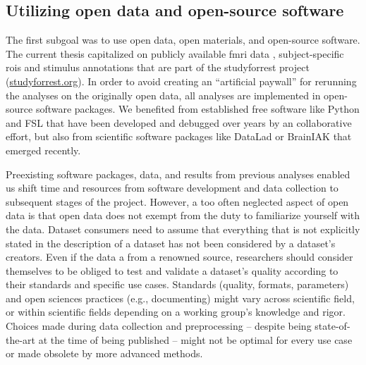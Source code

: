 \subsection{Utilizing open data and open-source software}

%
The first subgoal was to use open data, open materials, and open-source
software.
%
The current thesis capitalized on publicly available
%
\ac{fmri} data \citep{hanke2014audiomovie, hanke2016simultaneous,
sengupta2016extension},
%
subject-specific \acp{roi} \citep{sengupta2016extension} and
%
stimulus annotations \citep{haeusler2016cutanno}
%
that are part of the studyforrest project
(\href{www.studyforrest.org}{\url{studyforrest.org}}).
%
In order to avoid creating an ``artificial paywall'' for rerunning the analyses
on the originally open data, all analyses are implemented in open-source
software packages.
%
We benefited from established free software like
%
Python and
%
FSL \citep[\href{https://www.fmrib.ox.ac.uk/fsl}{FMRIB's Software
Library;}][]{smith2004fsl} that have been developed and debugged over years by
an collaborative effort,
%
but also from scientific software packages like
%
DataLad
\citep[\href{www.datalad.org}{\url{datalad.org}};][]{halchenko2021datalad} or
%
BrainIAK
\citep[\href{https://brainiak.org}{\url{brainiak.org}};][]{kumar2020brainiak,
kumar2020brainiaktutorial}
%
that emerged recently.

%
Preexisting software packages, data, and results from previous analyses enabled
us shift time and resources from software development and data collection to
subsequent stages of the project.
%
However, a too often neglected aspect of open data is that open data does not
exempt from the duty to familiarize yourself with the data.
Dataset consumers need to assume that everything that is not explicitly
stated in the description of a dataset has not been considered by a dataset's
creators.
Even if the data a from a renowned source, researchers should consider
themselves to be obliged to test and validate a dataset's quality according to
their standards and specific use cases.
%
Standards (quality, formats, parameters) and open sciences practices (e.g.,
documenting) might vary across scientific field, or within scientific fields
depending on a working group's knowledge and rigor.
%
Choices made during data collection and preprocessing -- despite being
state-of-the-art at the time of being published -- might not be optimal for
every use case or made obsolete by more advanced methods.

